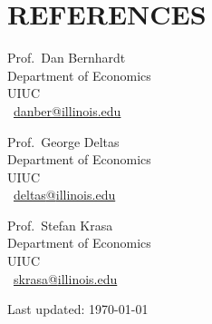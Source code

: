\documentclass{article}
\begin{document}

\section{REFERENCES}
\begin{paracol}{3}

    \noindent Prof.\ Dan Bernhardt\\
    Department of Economics\\
    UIUC\\
    \Letter\ \href{mailto:danber@illinois.edu}{danber\textrm{@}illinois.edu}

\switchcolumn

    \noindent Prof.\ George Deltas\\
    Department of Economics\\
    UIUC\\
    \Letter\ \href{mailto:deltas@illinois.edu}{deltas\textrm{@}illinois.edu}

\switchcolumn

    \noindent Prof.\ Stefan Krasa\\
    Department of Economics\\
    UIUC\\
    \Letter\ \href{skrasa@illinois.edu}{skrasa\textrm{@}illinois.edu}

\end{paracol}

\vspace{5em}
\begin{center}   
	\begin{small}     
	  Last updated: \today 
	\end{small} 
\end{center}
\end{document}

